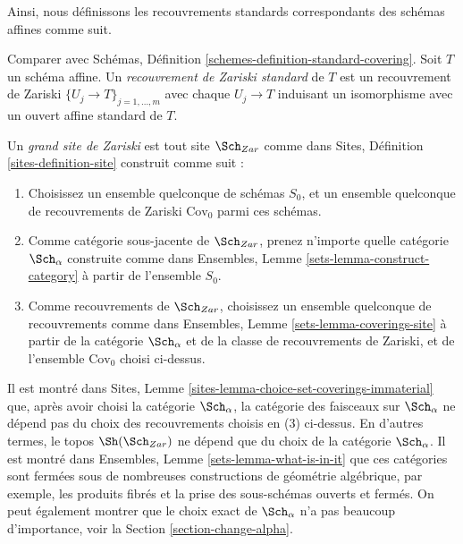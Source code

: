 \noindent
Ainsi, nous définissons les recouvrements standards correspondants des schémas affines comme suit.

\begin{definition}
\label{definition-standard-Zariski}
Comparer avec Schémas, Définition \ref{schemes-definition-standard-covering}. Soit $T$ un schéma affine. Un {\it recouvrement de Zariski standard} de $T$ est un recouvrement de Zariski $\{U_j \to T\}_{j = 1, \ldots, m}$ avec chaque $U_j \to T$ induisant un isomorphisme avec un ouvert affine standard de $T$.
\end{definition}

\begin{definition}
\label{definition-big-zariski-site}
Un {\it grand site de Zariski} est tout site $\Sch_{Zar}$ comme dans Sites, Définition \ref{sites-definition-site} construit comme suit :
\begin{enumerate}
\item Choisissez un ensemble quelconque de schémas $S_0$, et un ensemble quelconque de recouvrements de Zariski $\text{Cov}_0$ parmi ces schémas.
\item Comme catégorie sous-jacente de $\Sch_{Zar}$, prenez n'importe quelle catégorie $\Sch_\alpha$ construite comme dans Ensembles, Lemme \ref{sets-lemma-construct-category} à partir de l'ensemble $S_0$.
\item Comme recouvrements de $\Sch_{Zar}$, choisissez un ensemble quelconque de recouvrements comme dans Ensembles, Lemme \ref{sets-lemma-coverings-site} à partir de la catégorie $\Sch_\alpha$ et de la classe de recouvrements de Zariski, et de l'ensemble $\text{Cov}_0$ choisi ci-dessus.
\end{enumerate}
\end{definition}

\noindent
Il est montré dans Sites, Lemme \ref{sites-lemma-choice-set-coverings-immaterial} que, après avoir choisi la catégorie $\Sch_\alpha$, la catégorie des faisceaux sur $\Sch_\alpha$ ne dépend pas du choix des recouvrements choisis en (3) ci-dessus. En d'autres termes, le topos $\Sh(\Sch_{Zar})$ ne dépend que du choix de la catégorie $\Sch_\alpha$. Il est montré dans Ensembles, Lemme \ref{sets-lemma-what-is-in-it} que ces catégories sont fermées sous de nombreuses constructions de géométrie algébrique, par exemple, les produits fibrés et la prise des sous-schémas ouverts et fermés. On peut également montrer que le choix exact de $\Sch_\alpha$ n'a pas beaucoup d'importance, voir la Section \ref{section-change-alpha}.

